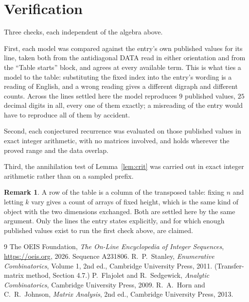 \documentclass[11pt,a4paper]{article}
\theoremstyle{plain}
\theoremstyle{definition}
\newtheorem{remark}[theorem]{Remark}
\begin{document}
\section{Verification}

Three checks, each independent of the algebra above.

First, each model was compared against the entry's own published values for its line, taken
both from the antidiagonal DATA read in either orientation and from the ``Table starts''
block, and agrees at every available term. This is what ties a model to the table:
substituting the fixed index into the entry's wording is a reading of English, and a wrong
reading gives a different digraph and different counts. Across the lines settled here the
model reproduces $9$ published values, $25$ decimal digits in all, every one of
them exactly; a misreading of the entry would have to reproduce all of them by accident.

Second, each conjectured recurrence was evaluated on those published values in exact
integer arithmetic, with no matrices involved, and holds wherever the proved range and the
data overlap.

Third, the annihilation test of Lemma~\ref{lem:crit} was carried out in exact integer
arithmetic rather than on a sampled prefix.

\begin{remark}
A row of the table is a column of the transposed table: fixing $n$ and letting $k$ vary gives a
count of arrays of fixed height, which is the same kind of object with the two dimensions
exchanged. Both are settled here by the same argument. Only the lines the entry states
explicitly, and for which enough published values exist to run the first check above, are
claimed.
\end{remark}

\begin{thebibliography}{9}
 The OEIS Foundation, \emph{The On-Line Encyclopedia of Integer
Sequences}, \url{https://oeis.org}, 2026. Sequence A231806.
 R.~P.~Stanley, \emph{Enumerative Combinatorics}, Volume 1, 2nd ed.,
Cambridge University Press, 2011. (Transfer-matrix method, Section 4.7.)
 P.~Flajolet and R.~Sedgewick, \emph{Analytic Combinatorics}, Cambridge
University Press, 2009.
 R.~A.~Horn and C.~R.~Johnson, \emph{Matrix Analysis}, 2nd ed., Cambridge
University Press, 2013.
\end{thebibliography}
\end{document}
